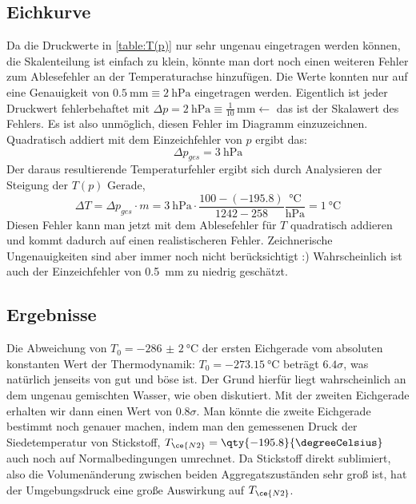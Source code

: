 \subsection{Eichkurve}
Da die Druckwerte in \cref{table:T(p)} nur sehr ungenau eingetragen werden können, die Skalenteilung ist einfach zu klein, könnte man dort noch einen weiteren Fehler zum Ablesefehler an der Temperaturachse hinzufügen. 
Die Werte konnten nur auf eine Genauigkeit von \(\qty{0.5}{\milli\meter}\equiv\qty{2}{\hecto\pascal}\) eingetragen werden. Eigentlich ist jeder Druckwert fehlerbehaftet mit \(\Delta p=\qty{2}{\hecto\pascal}\equiv\frac{1}{10}\,\unit{\milli\meter}\leftarrow\) das ist der Skalawert des Fehlers. Es ist also unmöglich, diesen Fehler im Diagramm einzuzeichnen. Quadratisch addiert mit dem Einzeichfehler von \(p\) ergibt das:
\[\Delta p_{ges}=\qty{3}{\hecto\pascal}\]
Der daraus resultierende Temperaturfehler ergibt sich durch Analysieren der Steigung der \(T(p)\) Gerade, 
\[\Delta T=\Delta p_{ges}\cdot m=\qty{3}{\hecto\pascal}\cdot\frac{100-(-195.8)}{1242-258}\frac{\unit{\degreeCelsius}}{\unit{\hecto\pascal}}=\qty{1}{\degreeCelsius}\]
Diesen Fehler kann man jetzt mit dem Ablesefehler für \(T\) quadratisch addieren und kommt dadurch auf einen realistischeren Fehler. Zeichnerische Ungenauigkeiten sind aber immer noch nicht berücksichtigt :) Wahrscheinlich ist auch der Einzeichfehler von \qty{0.5}{\milli\meter} zu niedrig geschätzt.


\subsection{Ergebnisse}
Die Abweichung von \(T_0=\qty{-286(2)}{\degreeCelsius}\) der ersten Eichgerade vom absoluten konstanten Wert der Thermodynamik: \(T_0=\qty{-273.15}{\degreeCelsius}\) beträgt \(6.4\sigma\), was natürlich jenseits von gut und böse ist. Der Grund hierfür liegt wahrscheinlich an dem ungenau gemischten Wasser, wie oben diskutiert. 
Mit der zweiten Eichgerade erhalten wir dann einen Wert von \(0.8\sigma\). Man könnte die zweite Eichgerade bestimmt noch genauer machen, indem man den gemessenen Druck der Siedetemperatur von Stickstoff, \(T_{\ce{N2}}=\qty{-195.8}{\degreeCelsius}\) auch noch auf Normalbedingungen umrechnet. Da Stickstoff direkt sublimiert, also die Volumenänderung zwischen beiden Aggregatszuständen sehr groß ist, hat der Umgebungsdruck eine große Auswirkung auf \(T_{\ce{N2}}\).

